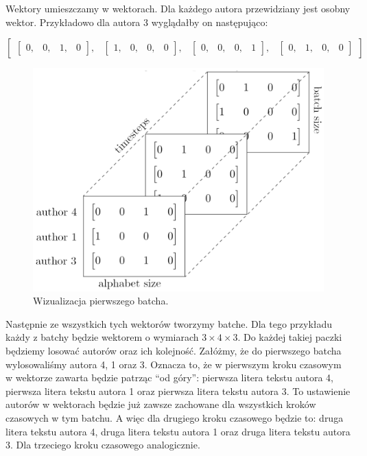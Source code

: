 Wektory umieszczamy w wektorach. Dla każdego autora przewidziany jest osobny wektor. 
Przykładowo dla autora 3 wyglądałby on następująco:
\vspace{3mm}

$
\begin{bmatrix} \begin{bmatrix} 0, & 0, & 1, & 0\end{bmatrix},  & \begin{bmatrix} 1, & 0, & 0, & 0\end{bmatrix}, & \begin{bmatrix} 0, & 0, & 0, & 1\end{bmatrix}, & \begin{bmatrix} 0, & 1, & 0, & 0\end{bmatrix} \end{bmatrix}
$



\begin{figure}
\vspace{-4mm}
\includegraphics[width=\linewidth]{./images/batch.png}
\caption{Wizualizacja pierwszego batcha.}
\label{fig:test2}
\vspace{-4mm}
\end{figure}
\vspace{4mm}
Następnie ze wszystkich tych wektorów tworzymy batche.
Dla tego przykładu każdy z batchy będzie wektorem o wymiarach $3 \times 4 \times 3$.
Do każdej takiej paczki będziemy losować autorów oraz ich kolejność. Załóżmy, że do pierwszego batcha
wylosowaliśmy autora 4, 1 oraz 3. Oznacza to, że w pierwszym kroku czasowym w wektorze zawarta będzie 
patrząc ``od góry'': pierwsza litera tekstu autora 4, pierwsza litera tekstu autora 1 oraz pierwsza litera tekstu autora 3.
To ustawienie autorów w wektorach będzie już zawsze zachowane dla wszystkich kroków czasowych w tym batchu. 
A więc dla drugiego kroku czasowego będzie to: druga litera tekstu autora 4, druga litera tekstu autora 1 oraz druga 
litera tekstu autora 3. Dla trzeciego kroku czasowego analogicznie. 

